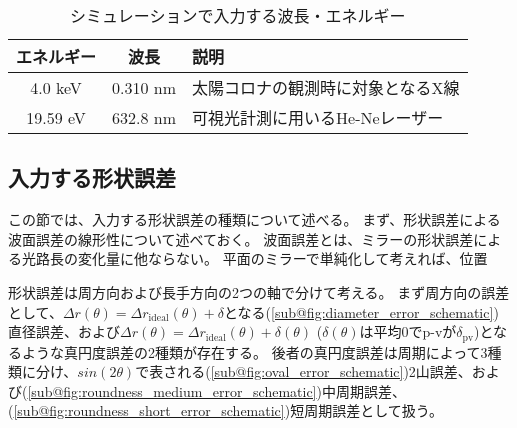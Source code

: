 \begin{table}[!ht]
\begin{center}
  \begin{tabular}{|c|c|l|} \hline
    エネルギー & 波長 & 説明 \\ \hline
    4.0 keV & 0.310 nm & 太陽コロナの観測時に対象となるX線 \\
    19.59 eV & 632.8 nm & 可視光計測に用いるHe-Neレーザー \\ \hline
  \end{tabular}
  \caption{シミュレーションで入力する波長・エネルギー}
  \label{tb:simulation_target_energy}
\end{center}
\end{table}

\subsection{入力する形状誤差}
\label{chap2_error_input_types}

この節では、入力する形状誤差の種類について述べる。
まず、形状誤差による波面誤差の線形性について述べておく。
波面誤差とは、ミラーの形状誤差による光路長の変化量に他ならない。
平面のミラーで単純化して考えれば、位置

形状誤差は周方向および長手方向の2つの軸で分けて考える。
まず周方向の誤差として、$\Delta r(\theta)=\Delta r_{\mathrm{ideal}}(\theta) + \delta$となる(\ref{sub@fig:diameter_error_schematic})直径誤差、および$\Delta r(\theta)=\Delta r_{\mathrm{ideal}}(\theta) + \delta(\theta)$ ($\delta(\theta)$は平均$0$でp-vが$\delta_{\mathrm{pv}}$)となるような真円度誤差の2種類が存在する。
後者の真円度誤差は周期によって3種類に分け、$sin(2\theta)$で表される(\ref{sub@fig:oval_error_schematic})2山誤差、および(\ref{sub@fig:roundness_medium_error_schematic})中周期誤差、(\ref{sub@fig:roundness_short_error_schematic})短周期誤差として扱う。

